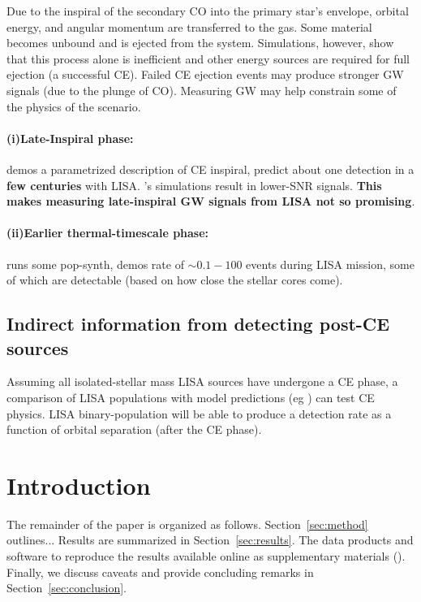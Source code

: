 \documentclass[floatfix,ApJL, twocolumn]{aastex631}
\begin{document}
Due to the inspiral of the secondary CO into the primary star’s envelope, orbital energy, and angular momentum are transferred to the gas. Some material becomes unbound and is ejected from the system. Simulations, however, show that this process alone is inefficient and other energy sources \cite[e.g. ionization of envelope material][]{Roepke:2022:arXiv} are required for full ejection (a successful CE). 
Failed CE ejection events may produce stronger GW signals (due to the plunge of CO). Measuring GW may help constrain some of the physics of the scenario. 


\paragraph{\textbf{(i)Late-Inspiral phase:}}
\cite{Ginat:2020:MNRAS} demos a parametrized description of CE inspiral,  predict about one detection in a \textbf{few centuries} with LISA. \cite{Ohlmann:2016:ApJL}'s simulations result in lower-SNR signals. 
\textbf{This makes measuring late-inspiral GW signals from LISA not so promising}.

\paragraph{\textbf{(ii)Earlier thermal-timescale phase:}}
\cite{Renzo:2021:ApJ} runs some pop-synth, demos rate of $\sim0.1-100$ events during LISA mission, some of which are detectable (based on how close the stellar cores come). 



\subsection{Indirect information from detecting post-CE sources}
Assuming all isolated-stellar mass LISA sources have undergone a CE phase, a comparison of LISA populations with model predictions (eg \cite{Wagg:2022:ApJ}) can test CE physics. 
LISA binary-population will be able to produce a detection rate as a function of orbital separation (after the CE phase). 



\section{Introduction}\label{sec:intro}

The remainder of the paper is organized as follows.
Section~\ref{sec:method} outlines...
Results are summarized in Section~\ref{sec:results}.
The data products and software to reproduce the results available online as supplementary materials (\projectUrl).
Finally, we discuss caveats and provide concluding remarks in Section~\ref{sec:conclusion}.
\end{document}
